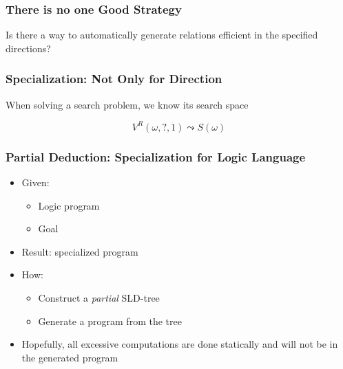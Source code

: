 \documentclass[xcolor=table]{beamer}
\begin{document}
\begin{frame}[fragile]
  \transwipe[direction=90]
  \frametitle{There is no one Good Strategy}
  
\begin{center}  
Is there a way to automatically generate relations efficient in the specified directions? 
\end{center}
  
\end{frame}


\begin{frame}[fragile]
  \transwipe[direction=90]
  \frametitle{Specialization: Not Only for Direction}
\begin{center} When solving a search problem, we know its search space  \end{center}
  
\[  V^R(\omega, ?, 1) \leadsto S(\omega) \]
\end{frame}

\begin{frame}[fragile]
  \transwipe[direction=90]
  \frametitle{Partial Deduction: Specialization for Logic Language}
\begin{itemize}
	\item Given: 
	\begin{itemize}
		\item Logic program
		\item Goal
	\end{itemize}
	\item Result: specialized program
	\item How:
	\begin{itemize}
		\item Construct a \emph{partial} SLD-tree
		\item Generate a program from the tree
	\end{itemize}
	\item Hopefully, all excessive computations are done statically and will not be in the generated program
\end{itemize}
\end{frame}
\end{document}
